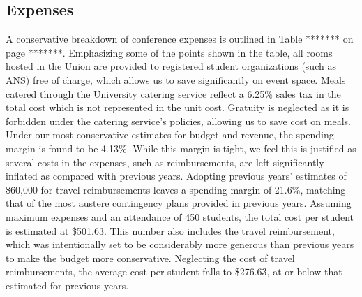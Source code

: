 \subsection{Expenses}
A conservative breakdown of conference expenses is outlined in Table ******* on page *******. Emphasizing some of the points shown in the table, all rooms hosted in the Union are provided to registered student organizations (such as ANS) free of charge, which allows us to save significantly on event space. Meals catered through the University catering service reflect a 6.25\% sales tax in the total cost which is not represented in the unit cost. Gratuity is neglected as it is forbidden under the catering service’s policies, allowing us to save cost on meals. 
Under our most conservative estimates for budget and revenue, the spending margin is found to be 4.13\%. While this margin is tight, we feel this is justified as several costs in the expenses, such as reimbursements, are left significantly inflated as compared with previous years. Adopting previous years’ estimates of \$60,000 for travel reimbursements leaves a spending margin of 21.6\%, matching that of the most austere contingency plans provided in previous years. 
Assuming maximum expenses and an attendance of 450 students, the total cost per student is estimated at \$501.63. This number also includes the travel reimbursement, which was intentionally set to be considerably more generous than previous years to make the budget more conservative. Neglecting the cost of travel reimbursements, the average cost per student falls to \$276.63, at or below that estimated for previous years. 

